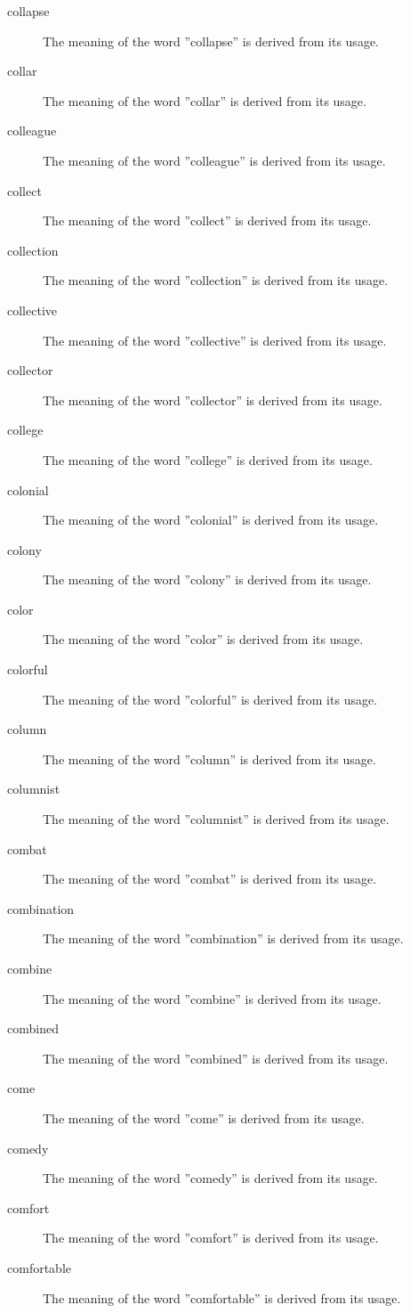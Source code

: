 \documentclass[12pt, letterpaper]{memoir}
\begin{document}
\begin{description}
\item[collapse] The meaning of the word ''collapse'' is derived from its usage.
\item[collar] The meaning of the word ''collar'' is derived from its usage.
\item[colleague] The meaning of the word ''colleague'' is derived from its usage.
\item[collect] The meaning of the word ''collect'' is derived from its usage.
\item[collection] The meaning of the word ''collection'' is derived from its usage.
\item[collective] The meaning of the word ''collective'' is derived from its usage.
\item[collector] The meaning of the word ''collector'' is derived from its usage.
\item[college] The meaning of the word ''college'' is derived from its usage.
\item[colonial] The meaning of the word ''colonial'' is derived from its usage.
\item[colony] The meaning of the word ''colony'' is derived from its usage.
\item[color] The meaning of the word ''color'' is derived from its usage.
\item[colorful] The meaning of the word ''colorful'' is derived from its usage.
\item[column] The meaning of the word ''column'' is derived from its usage.
\item[columnist] The meaning of the word ''columnist'' is derived from its usage.
\item[combat] The meaning of the word ''combat'' is derived from its usage.
\item[combination] The meaning of the word ''combination'' is derived from its usage.
\item[combine] The meaning of the word ''combine'' is derived from its usage.
\item[combined] The meaning of the word ''combined'' is derived from its usage.
\item[come] The meaning of the word ''come'' is derived from its usage.
\item[comedy] The meaning of the word ''comedy'' is derived from its usage.
\item[comfort] The meaning of the word ''comfort'' is derived from its usage.
\item[comfortable] The meaning of the word ''comfortable'' is derived from its usage.

\end{description}
\end{document}
